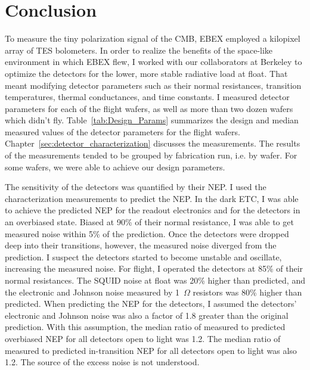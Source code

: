 \chapter{Conclusion}
\label{conclusion_chapter}

To measure the tiny polarization signal of the \ac{CMB}, \ac{EBEX} employed a kilopixel array of \ac{TES} bolometers. 
In order to realize the benefits of the space-like environment in which \ac{EBEX} flew, I worked with our collaborators at Berkeley to optimize the detectors for the lower, more stable radiative load at float.  
That meant modifying detector parameters such as their normal resistances, transition temperatures, thermal conductances, and time constants. 
I measured detector parameters for each of the flight wafers, as well as more than two dozen wafers which didn't fly. 
Table~\ref{tab:Design_Params} summarizes the design and median measured values of the detector parameters for the flight wafers. 
Chapter~\ref{sec:detector_characterization} discusses the measurements. 
The results of the measurements tended to be grouped by fabrication run, i.e. by wafer. 
For some wafers, we were able to achieve our design parameters. 

The sensitivity of the detectors was quantified by their \ac{NEP}. 
I used the characterization measurements to predict the \ac{NEP}.
In the dark \ac{ETC}, I was able to achieve the predicted \ac{NEP} for the readout electronics and for the detectors in an overbiased state.
Biased at 90\% of their normal resistance, I was able to get measured noise within 5\% of the prediction. 
Once the detectors were dropped deep into their transitions, however, the measured noise diverged from the prediction. 
I suspect the detectors started to become unstable and oscillate, increasing the measured noise. 
For flight, I operated the detectors at 85\% of their normal resistances. 
The \ac{SQUID} noise at float was 20\% higher than predicted, and the electronic and Johnson noise measured by 1~$\Omega$ resistors was 80\% higher than predicted. 
When predicting the \ac{NEP} for the detectors, I assumed the detectors' electronic and Johnson noise was also a factor of 1.8 greater than the original prediction. 
With this assumption, the median ratio of measured to predicted overbiased \ac{NEP} for all detectors open to light was 1.2. 
The median ratio of measured to predicted in-transition \ac{NEP} for all detectors open to light was also 1.2. 
The source of the excess noise is not understood. 

